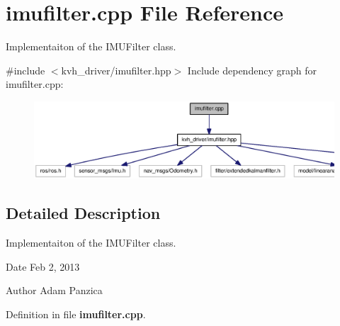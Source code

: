 \section{imufilter.\-cpp \-File \-Reference}
\label{imufilter_8cpp}


\-Implementaiton of the \-I\-M\-U\-Filter class.  


{\ttfamily \#include $<$kvh\-\_\-driver/imufilter.\-hpp$>$}\*
\-Include dependency graph for imufilter.\-cpp\-:\nopagebreak
\begin{figure}[H]
\begin{center}
\leavevmode
\includegraphics[width=350pt]{imufilter_8cpp__incl}
\end{center}
\end{figure}


\subsection{\-Detailed \-Description}
\-Implementaiton of the \-I\-M\-U\-Filter class. \begin{DoxyDate}{\-Date}
\-Feb 2, 2013 
\end{DoxyDate}
\begin{DoxyAuthor}{\-Author}
\-Adam \-Panzica 
\end{DoxyAuthor}


\-Definition in file {\bf imufilter.\-cpp}.

